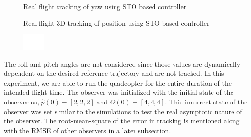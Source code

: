 \documentclass[letterpaper%
, twoside%
, 12pt%
,memoire%
, english%
,creativecommons,hyperref%
]{thETS}
\theoremstyle{newThmStyle}
\begin{document}
\begin{figure}[H]
	\centering
	\parbox{0.65\textwidth}{\caption{Real flight tracking of yaw using STO based controller\label{Fig:yawtracSTO}}}
\end{figure}
\begin{figure}[H]
	\centering
	\parbox{0.65\textwidth}{\caption{Real flight 3D tracking of position using STO based controller\label{Fig:3dSTO}}}
\end{figure}
\begin{figure}[H]
	\includegraphics[width=0.1\textwidth]{Figures/blank.png}
\end{figure}
The roll and pitch angles are not considered since those values are dynamically dependent on the desired reference trajectory and are not tracked. In this experiment, we are able to run the quadcopter for the entire duration of the intended flight time. The observer was initialized with the initial state of the observer as, $\hat{p}(0)=[2,2,2]$ and $\hat{\Theta}(0)=[4,4,4]$. This incorrect state of the observer was set similar to the simulations to test the real asymptotic nature of the observer. The root-mean-square of the error in tracking is mentioned along with the RMSE of other observers in a later subsection.
\end{document}
